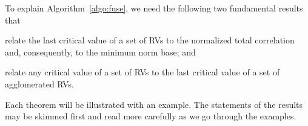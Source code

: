 %
%

To explain Algorithm~\ref{algo:fuse}, we need the following two fundamental results that
\begin{inparaenum}
\item 
relate the last critical value of a set of RVs to the normalized total correlation and,
consequently,
to the minimum norm base; and
\item 
relate any critical value of a set of RVs to the last critical value of a set of agglomerated RVs.
\end{inparaenum}
Each theorem will be illustrated with an example. %
The statements of the results may be
skimmed first and read more carefully as we go through the examples.

